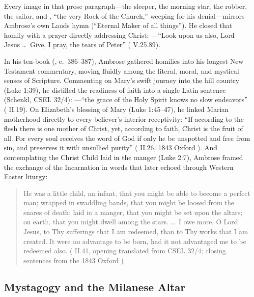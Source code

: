 Every image in that prose paragraph---the sleeper, the morning star, the robber, the sailor, and , ``the very Rock of the Church,'' weeping for his denial---mirrors Ambrose's own Lauds hymn  (``Eternal Maker of all things''). He closed that homily with a prayer directly addressing Christ: ---``Look upon us also, Lord Jesus \ldots\ Give, I pray, the tears of Peter'' ( V.25.89).

In his ten-book  (, c.~386--387), Ambrose gathered homilies into his longest New Testament commentary, moving fluidly among the literal, moral, and mystical senses of Scripture. Commenting on Mary's swift journey into the hill country (Luke 1:39), he distilled the readiness of faith into a single Latin sentence (Schenkl, CSEL 32/4): ---``the grace of the Holy Spirit knows no slow endeavors'' ( II.19). On Elizabeth's blessing of Mary (Luke 1:45--47), he linked Marian motherhood directly to every believer's interior receptivity: ``If according to the flesh there is one mother of Christ, yet, according to faith, Christ is the fruit of all. For every soul receives the word of God if only he be unspotted and free from sin, and preserves it with unsullied purity'' ( II.26, 1843 Oxford ). And contemplating the Christ Child laid in the manger (Luke 2:7), Ambrose framed the exchange of the Incarnation in words that later echoed through Western Easter liturgy:

\begin{quote}
He was a little child, an infant, that you might be able to become a perfect man; wrapped in swaddling bands, that you might be loosed from the snares of death; laid in a manger, that you might be set upon the altars; on earth, that you might dwell among the stars. \ldots\ I owe more, O Lord Jesus, to Thy sufferings that I am redeemed, than to Thy works that I am created. It were no advantage to be born, had it not advantaged me to be redeemed also. ( II.41, opening translated from CSEL 32/4; closing sentences from the 1843 Oxford )
\end{quote}

\subsection{Mystagogy and the Milanese Altar}

